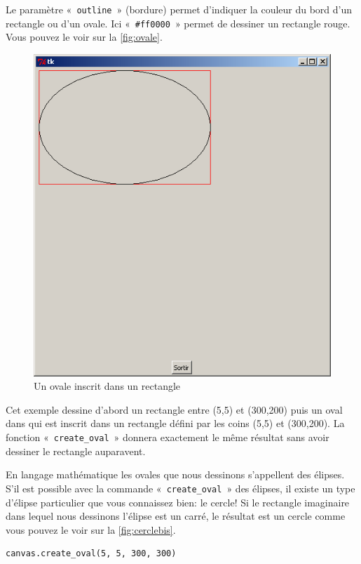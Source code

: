 Le paramètre «~\texttt{outline}~» (bordure) permet d'indiquer la couleur du bord d'un rectangle ou d'un ovale.
Ici «~\texttt{\#ff0000}~» permet de dessiner un rectangle rouge. Vous pouvez le voir sur la \autoref{fig:ovale}.

\begin{figure}[h!]
\centering
\includegraphics[scale=0.4]{images/ovale}
\caption{Un ovale inscrit dans un rectangle}\label{fig:ovale}
\end{figure}

Cet exemple dessine d'abord un rectangle entre (5,5) et (300,200) puis un oval dans qui est inscrit dans un rectangle défini par les coins (5,5) et (300,200). La fonction «~\texttt{create\_oval}~» donnera exactement le même résultat sans avoir dessiner le rectangle auparavent.

En langage mathématique les ovales que nous dessinons s'appellent des élipses.
S'il est possible avec la commande «~\texttt{create\_oval}~»  des élipses, il existe un type d'élipse particulier que vous connaissez bien: le cercle!  Si le rectangle imaginaire dans lequel nous dessinons l'élipse est un carré, le résultat est un cercle comme vous pouvez le voir sur la \autoref{fig:cerclebis}.

\begin{Verbatim}[frame=single,rulecolor=\color{mbleu}, label=à taper]
canvas.create_oval(5, 5, 300, 300)
\end{Verbatim}

